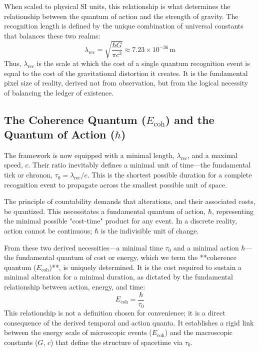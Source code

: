 \documentclass[11pt,a4paper]{article}
\begin{document}
When scaled to physical SI units, this relationship is what determines the relationship between the quantum of action and the strength of gravity. The recognition length is defined by the unique combination of universal constants that balances these two realms:
\begin{equation}
\lambda_{\text{rec}} = \sqrt{\frac{\hbar G}{\pi c^3}} \approx 7.23 \times 10^{-36}\,\mathrm{m}
\end{equation}
Thus, \(\lambda_{\text{rec}}\) is the scale at which the cost of a single quantum recognition event is equal to the cost of the gravitational distortion it creates. It is the fundamental pixel size of reality, derived not from observation, but from the logical necessity of balancing the ledger of existence.

\subsection{The Coherence Quantum (\texorpdfstring{$E_{\text{coh}}$}{E_coh}) and the Quantum of Action (\texorpdfstring{$\hbar$}{h-bar})}
The framework is now equipped with a minimal length, \(\lambda_{\text{rec}}\), and a maximal speed, \(c\). Their ratio inevitably defines a minimal unit of time—the fundamental tick or chronon, \(\tau_0 = \lambda_{\text{rec}} / c\). This is the shortest possible duration for a complete recognition event to propagate across the smallest possible unit of space.

The principle of countability demands that alterations, and their associated costs, be quantized. This necessitates a fundamental quantum of action, \(\hbar\), representing the minimal possible "cost-time" product for any event. In a discrete reality, action cannot be continuous; \(\hbar\) is the indivisible unit of change.

From these two derived necessities—a minimal time \(\tau_0\) and a minimal action \(\hbar\)—the fundamental quantum of cost or energy, which we term the **coherence quantum (\(E_{\text{coh}}\))**, is uniquely determined. It is the cost required to sustain a minimal alteration for a minimal duration, as dictated by the fundamental relationship between action, energy, and time:
\begin{equation}
E_{\text{coh}} = \frac{\hbar}{\tau_0}
\end{equation}
This relationship is not a definition chosen for convenience; it is a direct consequence of the derived temporal and action quanta. It establishes a rigid link between the energy scale of microscopic events (\(E_{\text{coh}}\)) and the macroscopic constants (\(G\), \(c\)) that define the structure of spacetime via \(\tau_0\).
\end{document}
